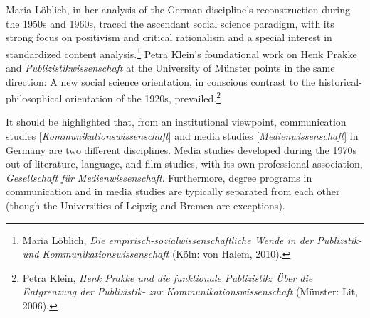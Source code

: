 \documentclass{tufte-handout}
\begin{document}
Maria Löblich, in her analysis of the German discipline's reconstruction
during the 1950s and 1960s, traced the ascendant social science
paradigm, with its strong focus on positivism and critical rationalism
and a special interest in standardized content analysis.\footnote{Maria
  Löblich, \emph{Die empirisch-sozialwissenschaftliche Wende in der
  Publizstik- und Kommunikationswissenschaft} (Köln: von Halem, 2010).}
Petra Klein's foundational work on Henk Prakke and
\emph{Publizistikwissenschaft} at the University of Münster points in
the same direction: A new social science orientation, in conscious
contrast to the historical-philosophical orientation of the 1920s,
prevailed.\footnote{Petra Klein, \emph{Henk Prakke und die funktionale
  Publizistik: Über die Entgrenzung der Publizistik- zur
  Kommunikationswissenschaft} (Münster: Lit, 2006).}

It should be highlighted that, from an institutional viewpoint,
communication studies {[}\emph{Kommunikationswissenschaft}{]} and media
studies {[}\emph{Medienwissenschaft}{]} in Germany are two different
disciplines. Media studies developed during the 1970s out of literature,
language, and film studies, with its own professional association,
\emph{Gesellschaft für Medienwissenschaft}. Furthermore, degree programs
in communication and in media studies are typically separated from each
other (though the Universities of Leipzig and Bremen are exceptions).
\end{document}
